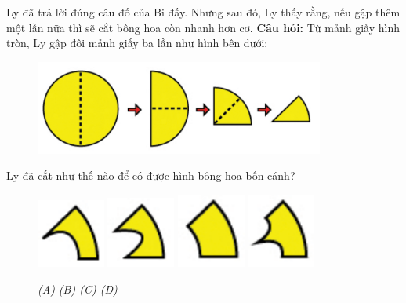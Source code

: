 Ly đã trả lời đúng câu đố của Bi đấy. Nhưng sau đó, Ly thấy rằng, nếu gập thêm một lần nữa thì sẽ cắt bông hoa còn nhanh hơn cơ.
\vskip0.25cm
\textbf{Câu hỏi:} Từ mảnh giấy hình tròn, Ly gập đôi mảnh giấy ba lần như hình bên dưới: 
\begin{figure}[H]
	\vspace*{-10pt}
	\captionsetup{labelformat=empty}
	\centering
	\captionsetup{justification=raggedleft}
	\includegraphics[width =0.85\textwidth]{cat-14}
\end{figure}	
Ly  đã cắt như thế nào để có được hình bông hoa bốn cánh?
\begin{figure}[H]
	\centering
	\captionsetup{labelformat=empty}
	\vspace*{-10pt}
	\captionsetup{justification=centering}
	\includegraphics[width =0.2\textwidth]{cat-15a}
	\hfill
	\includegraphics[width =0.2\textwidth]{cat-15b}
	\hfill
	\includegraphics[width =0.2\textwidth]{cat-15c}
	\hfill
	\includegraphics[width =0.2\textwidth]{cat-15d}	
	\caption{\small \it (A)\hspace*{40pt} (B)\hspace*{65pt} (C) \hspace*{40pt} (D)}
	\vspace*{-10pt}
\end{figure}
